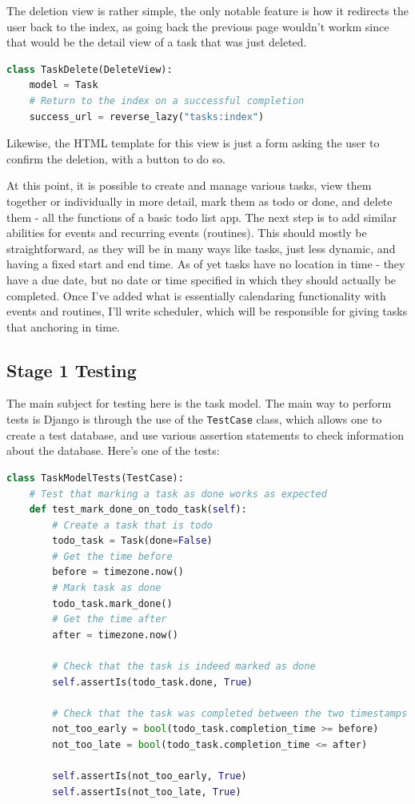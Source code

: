 \documentclass{article}
\begin{document}
The deletion view is rather simple,
the only notable feature is how it redirects the user back to the index,
as going back the previous page wouldn't workm
since that would be the detail view of a task that was just deleted.

\begin{lstlisting}[language=Python]
class TaskDelete(DeleteView):
    model = Task
    # Return to the index on a successful completion
    success_url = reverse_lazy("tasks:index")
\end{lstlisting}

Likewise,
the HTML template for this view is just a form asking the user to confirm the deletion,
with a button to do so.

At this point,
it is possible to create and manage various tasks,
view them together or individually in more detail,
mark them as todo or done,
and delete them -
all the functions of a basic todo list app.
The next step is to add similar abilities for events and recurring events (routines).
This should mostly be straightforward,
as they will be in many ways like tasks,
just less dynamic,
and having a fixed start and end time.
As of yet tasks have no location in time -
they have a due date,
but no date or time specified in which they should actually be completed.
Once I've added what is essentially calendaring functionality with events and routines,
I'll write scheduler,
which will be responsible for giving tasks that anchoring in time.

\subsection{Stage 1 Testing}
The main subject for testing here is the task model.
The main way to perform tests is Django is through the use of the \texttt{TestCase} class,
which allows one to create a test database,
and use various assertion statements to check information about the database.
Here's one of the tests:
\begin{lstlisting}[language=Python]
class TaskModelTests(TestCase):
    # Test that marking a task as done works as expected
    def test_mark_done_on_todo_task(self):
        # Create a task that is todo
        todo_task = Task(done=False)
        # Get the time before
        before = timezone.now()
        # Mark task as done
        todo_task.mark_done()
        # Get the time after
        after = timezone.now()

        # Check that the task is indeed marked as done
        self.assertIs(todo_task.done, True)

        # Check that the task was completed between the two timestamps
        not_too_early = bool(todo_task.completion_time >= before)
        not_too_late = bool(todo_task.completion_time <= after)

        self.assertIs(not_too_early, True)
        self.assertIs(not_too_late, True)
\end{lstlisting}
\end{document}

